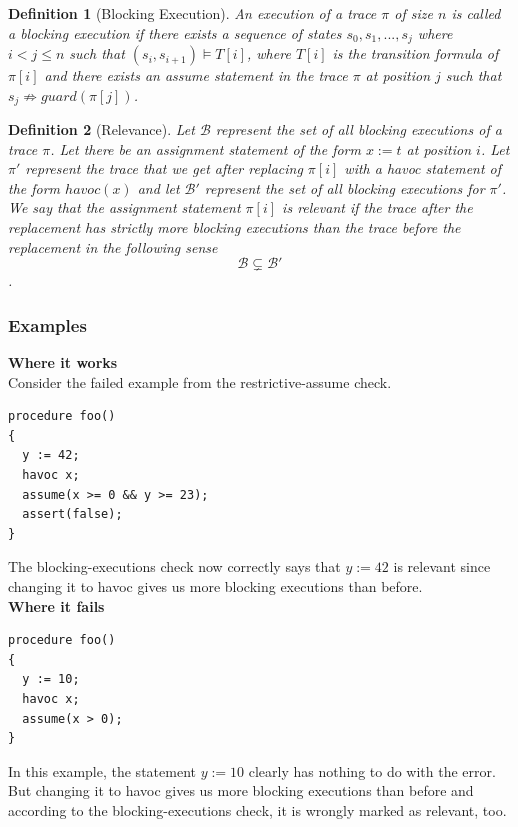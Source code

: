 \documentclass{article}
\newcommand{\limp}{\Rightarrow}
\newtheorem{mydef}{Definition}
\begin{document}
\begin{mydef}[Blocking Execution]\label{mydef:blockingexecution_definition}
An execution of a trace $\pi$ of size $n$ is called a \emph{blocking execution} if there exists a sequence of states $s_0, s_1,..., s_j$ where $i<j \leq n$ such that $(s_i, s_{i+1}) \models T[i]$, where $T[i]$ is the transition formula of $\pi[i]$ and there exists an assume statement in the trace $\pi$ at position $j$ such that $s_{j} \not \limp guard(\pi[j])$.
\end{mydef}

\begin{mydef}[Relevance]\label{mydef:relevancy_definition}
Let $\mathcal{B}$ represent the set of all blocking executions of a trace $\pi$. Let there be an assignment statement of the form $x:=t$ at position $i$. Let $\pi'$ represent the trace that we get after replacing $\pi[i]$ with a havoc statement of the form $havoc(x)$ and let $\mathcal{B}'$ represent the set of all blocking executions for $\pi'$.\\
We say that the assignment statement $\pi[i]$ is relevant if the trace after the replacement has strictly more blocking executions than the trace before the replacement in the following sense $$\mathcal{B} \subsetneq \mathcal{B}'$$. 
\end{mydef}
\subsubsection{Examples}
\textbf{Where it works}\\
Consider the failed example from the restrictive-assume check. 
\begin{lstlisting}
procedure foo()
{
  y := 42;
  havoc x;
  assume(x >= 0 && y >= 23);
  assert(false);
}
\end{lstlisting}
The blocking-executions check now correctly says that $y:=42$ is relevant since changing it to havoc gives us more blocking executions than before.\\
\textbf{Where it fails}
\begin{lstlisting}
procedure foo()
{
  y := 10;
  havoc x;
  assume(x > 0);
}
\end{lstlisting}
In this example, the statement $y:=10$ clearly has nothing to do with the error. But changing it to havoc gives us more blocking executions than before and according to the blocking-executions check, it is wrongly marked as relevant, too. 

\newpage
\end{document}
